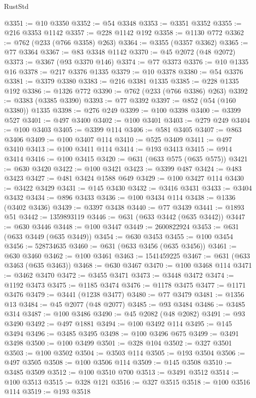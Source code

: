 \begin{lexlean}{RustStd}
\begin{coremodule}
@3351 := @10 @3350
@3352 := @54 @3348
@3353 := @3351 @3352
@3355 := @216 @3353 @1142
@3357 := @228 @1142 @192
@3358 := @1130 @772
@3362 := @762 (@233 (@766 @3358) @263)
@3364 := @3355 (@3357 @3362)
@3365 := @77 @3364
@3367 := @83 @3348 @1142
@3370 := @45 @2072 (@48 @2072)
@3373 := @3367 (@93 @3370 @146)
@3374 := @77 @3373
@3376 := @10 @1335 @16
@3378 := @217 @3376 @1335
@3379 := @10 @3378
@3380 := @54 @3376
@3381 := @3379 @3380
@3383 := @216 @3381 @1335
@3385 := @228 @1335 @192
@3386 := @1326 @772
@3390 := @762 (@233 (@766 @3386) @263)
@3392 := @3383 (@3385 @3390)
@3393 := @77 @3392
@3397 := @852 (@54 (@160 @3380)) @1335
@3398 := @276 @249
@3399 := @100 @3398
@3400 := @3399 @527
@3401 := @497 @3400
@3402 := @100 @3401
@3403 := @279 @249
@3404 := @100 @3403
@3405 := @3399 @114
@3406 := @581 @3405
@3407 := @863 @3406
@3409 := @100 @3407 @114
@3410 := @525 @3409
@3411 := @497 @3410
@3413 := @100 @3411 @114
@3414 := @193 @3413
@3415 := @914 @3414
@3416 := @100 @3415
@3420 := @631 (@633 @575 (@635 @575))
@3421 := @630 @3420
@3422 := @100 @3421
@3423 := @3399 @487
@3424 := @483 @3423
@3427 := @481 @3424 @1588 @649
@3429 := @100 @3427 @114
@3430 := @3422 @3429
@3431 := @145 @3430
@3432 := @3416 @3431
@3433 := @3404 @3432
@3434 := @896 @3433
@3436 := @100 @3434 @114
@3438 := @1336 (@3402 @3436)
@3439 := @3397 @3438
@3440 := @77 @3439
@3441 := @1893 @51
@3442 := 1359893119
@3446 := @631 (@633 @3442 (@635 @3442))
@3447 := @630 @3446
@3448 := @100 @3447
@3449 := 2600822924
@3453 := @631 (@633 @3449 (@635 @3449))
@3454 := @630 @3453
@3455 := @100 @3454
@3456 := 528734635
@3460 := @631 (@633 @3456 (@635 @3456))
@3461 := @630 @3460
@3462 := @100 @3461
@3463 := 1541459225
@3467 := @631 (@633 @3463 (@635 @3463))
@3468 := @630 @3467
@3470 := @100 @3468 @114
@3471 := @3462 @3470
@3472 := @3455 @3471
@3473 := @3448 @3472
@3474 := @1192 @3473
@3475 := @1185 @3474
@3476 := @1178 @3475
@3477 := @1171 @3476
@3479 := @3441 (@1238 @3477)
@3480 := @77 @3479
@3481 := @1356 @13
@3484 := @45 @2077 (@48 @2077)
@3485 := @93 @3484
@3486 := @3485 @314
@3487 := @100 @3486
@3490 := @45 @2082 (@48 @2082)
@3491 := @93 @3490
@3492 := @497 @1881
@3494 := @100 @3492 @114
@3495 := @145 @3494
@3496 := @3485 @3495
@3498 := @100 @3496 @675
@3499 := @3491 @3498
@3500 := @100 @3499
@3501 := @328 @104
@3502 := @327 @3501
@3503 := @100 @3502
@3504 := @3503 @114
@3505 := @193 @3504
@3506 := @497 @3505
@3508 := @100 @3506 @114
@3509 := @145 @3508
@3510 := @3485 @3509
@3512 := @100 @3510 @700
@3513 := @3491 @3512
@3514 := @100 @3513
@3515 := @328 @121
@3516 := @327 @3515
@3518 := @100 @3516 @114
@3519 := @193 @3518

\end{coremodule}
\end{lexlean}
